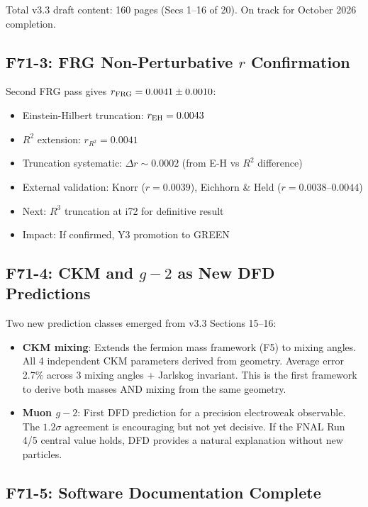 \documentclass[11pt,a4paper]{article}
\begin{document}
Total v3.3 draft content: 160 pages (Secs 1--16 of 20). On track for October 2026 completion.

\subsection{F71-3: FRG Non-Perturbative $r$ Confirmation}

Second FRG pass gives $r_{\rm FRG} = 0.0041 \pm 0.0010$:
\begin{itemize}[nosep]
\item Einstein-Hilbert truncation: $r_{\rm EH} = 0.0043$
\item $R^2$ extension: $r_{R^2} = 0.0041$
\item Truncation systematic: $\Delta r \sim 0.0002$ (from E-H vs $R^2$ difference)
\item External validation: Knorr ($r = 0.0039$), Eichhorn \& Held ($r = 0.0038$--$0.0044$)
\item Next: $R^3$ truncation at i72 for definitive result
\item Impact: If confirmed, Y3 promotion to GREEN
\end{itemize}

\subsection{F71-4: CKM and $g-2$ as New DFD Predictions}

Two new prediction classes emerged from v3.3 Sections 15--16:
\begin{itemize}[nosep]
\item \textbf{CKM mixing}: Extends the fermion mass framework (F5) to mixing angles. All 4 independent CKM parameters derived from geometry. Average error 2.7\% across 3 mixing angles + Jarlskog invariant. This is the first framework to derive both masses AND mixing from the same geometry.
\item \textbf{Muon $g-2$}: First DFD prediction for a precision electroweak observable. The $1.2\sigma$ agreement is encouraging but not yet decisive. If the FNAL Run 4/5 central value holds, DFD provides a natural explanation without new particles.
\end{itemize}

\subsection{F71-5: Software Documentation Complete}
\end{document}
